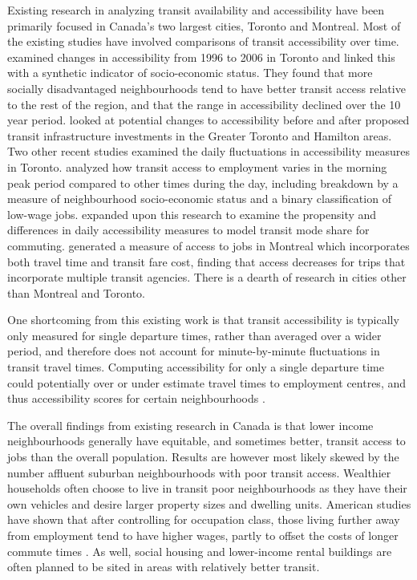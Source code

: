 \documentclass[11 pt, letterpaper]{article}
\begin{document}
{Existing research in analyzing transit availability and accessibility have been primarily focused in Canada's two largest cities, Toronto and Montreal. Most of the existing studies have involved comparisons of transit accessibility over time.  examined changes in accessibility from 1996 to 2006 in Toronto and linked this with a synthetic indicator of socio-economic status. They found that more socially disadvantaged neighbourhoods tend to have better transit access relative to the rest of the region, and that the range in accessibility declined over the 10 year period.  looked at potential changes to accessibility before and after proposed transit infrastructure investments in the Greater Toronto and Hamilton areas. Two other recent studies examined the daily fluctuations in accessibility measures in Toronto.  analyzed how transit access to employment varies in the morning peak period compared to other times during the day, including breakdown by a measure of neighbourhood socio-economic status and a binary classification of low-wage jobs.  expanded upon this research to examine the propensity and differences in daily accessibility measures to model transit mode share for commuting.  generated a measure of access to jobs in Montreal which incorporates both travel time and transit fare cost, finding that access decreases for trips that incorporate multiple transit agencies. There is a dearth of research in cities other than Montreal and Toronto.

One shortcoming from this existing work is that transit accessibility is typically only measured for single departure times, rather than averaged over a wider period, and therefore does not account for minute-by-minute fluctuations in transit travel times. Computing accessibility for only a single departure time could potentially over or under estimate travel times to employment centres, and thus accessibility scores for certain neighbourhoods \cite{owen2015,farber2017,conway2017}. 

The overall findings from existing research in Canada is that lower income neighbourhoods generally have equitable, and sometimes better, transit access to jobs than the overall population. Results are however most likely skewed by the number affluent suburban neighbourhoods with poor transit access. Wealthier households often choose to live in transit poor neighbourhoods as they have their own vehicles and desire larger property sizes and dwelling units. American studies have shown that after controlling for occupation class, those living further away from employment tend to have higher wages, partly to offset the costs of longer commute times \cite{madden1985}. As well, social housing and lower-income rental buildings are often planned to be sited in areas with relatively better transit. 

}
\end{document}
